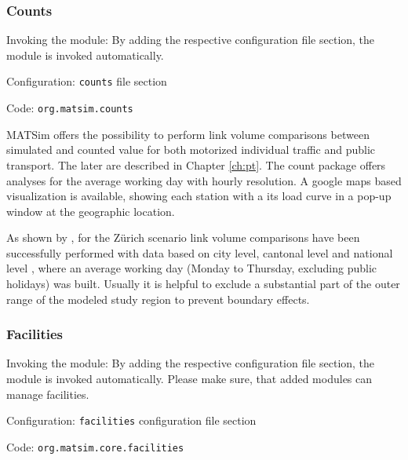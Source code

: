 
\subsubsection{Counts}
\label{sec:counts}
\begin{compactitem}
\item Invoking the module: By adding the respective configuration file section, the module is invoked automatically.
\item Configuration: \lstinline|counts| file section
\item Code: \lstinline|org.matsim.counts|
\end{compactitem}

MATSim offers the possibility to perform link volume comparisons between simulated and counted value for both motorized individual traffic \citep{Horni_unpub_IVT_2007}  and public transport. The later are described in Chapter \ref{ch:pt}. The count package offers analyses for the average working day with hourly resolution. A google maps based visualization is available, showing each station with a its load curve in a pop-up window at the geographic location.

As shown by \citet[][]{BalmerEtAl_ResRep_bdktzrh_2009}, for the Zürich scenario link volume comparisons have been successfully performed with data based on city level, cantonal level and national level \citep[][]{ASTRA_Webpage_2006}, where an average working day (Monday to Thursday, excluding public holidays) was built. Usually it is helpful to exclude a substantial part of the outer range of the modeled study region to prevent boundary effects.

\subsubsection{Facilities}
\label{sec:facilities}
\begin{compactitem}
\item Invoking the module: By adding the respective configuration file section, the module is invoked automatically. Please make sure, that added modules can manage facilities.
\item Configuration: \lstinline|facilities| configuration file section
\item Code: \lstinline|org.matsim.core.facilities|
\end{compactitem}

